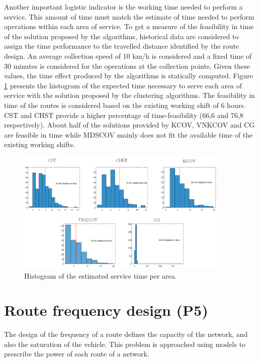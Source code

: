 Another important logistic indicator is the working time needed to perform a service. This amount of time must match the estimate of time needed to perform operations within each area of service. To get a measure of the feasibility in time of the solution proposed by the algorithms, historical data are considered to assign the time performance to the travelled distance identified by the route design. An average collection speed of 10 km/h is considered and a fixed time of 30 minutes is considered for the operations at the collection points. Given these values, the time effect produced by the algorithms is statically computed. Figure \ref{fig_ROMA_time} presents the histogram of the expected time necessary to serve each area of service with the solution proposed by the clustering algorithms. The feasibility in time of the routes is considered based on the existing working shift of 6 hours. CST and CHST provide a higher percentage of time-feasibility (66,6 and 76,8 respectively). About half of the solutions provided by KCOV, VNKCOV and CG are feasible in time while MDSCOV mainly does not fit the available time of the existing working shifts.

\begin{figure}[hbt!]
\centering
\includegraphics[width=0.9\textwidth]{SectionDistribution/design_figures/fig_ROMA_time.png}
\captionsetup{type=figure}
\caption{Histogram of the estimated service time per area.}
\label{fig_ROMA_time}
\end{figure}

\section{Route frequency design (P5)}
The design of the frequency of a route defines the capacity of the network, and also the saturation of the vehicle. This problem is approached using models to prescribe the power of each route of a network.

